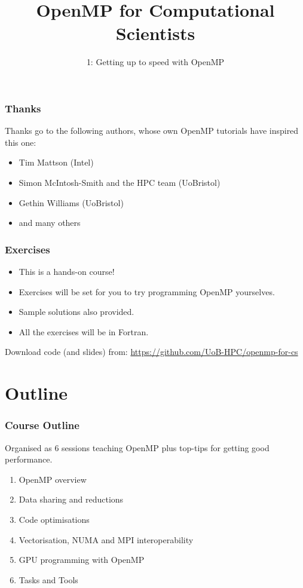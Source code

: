\documentclass{beamer}
\title{OpenMP for Computational Scientists}
\subtitle{1: Getting up to speed with OpenMP}
\begin{document}
\frame{\titlepage}

\begin{frame}
\frametitle{Thanks}
Thanks go to the following authors, whose own OpenMP tutorials have inspired this one:
\begin{itemize}
  \item Tim Mattson (Intel)
  \item Simon McIntosh-Smith and the HPC team (UoBristol)
  \item Gethin Williams (UoBristol)
  \item and many others
\end{itemize}
\end{frame}

\begin{frame}
\frametitle{Exercises}
\begin{itemize}
\item This is a hands-on course!
\item Exercises will be set for you to try programming OpenMP yourselves.
\item Sample solutions also provided.
\item All the exercises will be in Fortran.
\end{itemize}

Download code (and slides) from:
\url{https://github.com/UoB-HPC/openmp-for-cs}
\end{frame}

\section{Outline}
\begin{frame}
\frametitle{Course Outline}
Organised as 6 sessions teaching OpenMP plus top-tips for getting good performance.
\begin{enumerate}
  \item OpenMP overview
  \item Data sharing and reductions
  \item Code optimisations
  \item Vectorisation, NUMA and MPI interoperability
  \item GPU programming with OpenMP
  \item Tasks and Tools
\end{enumerate}
\end{frame}
\end{document}
